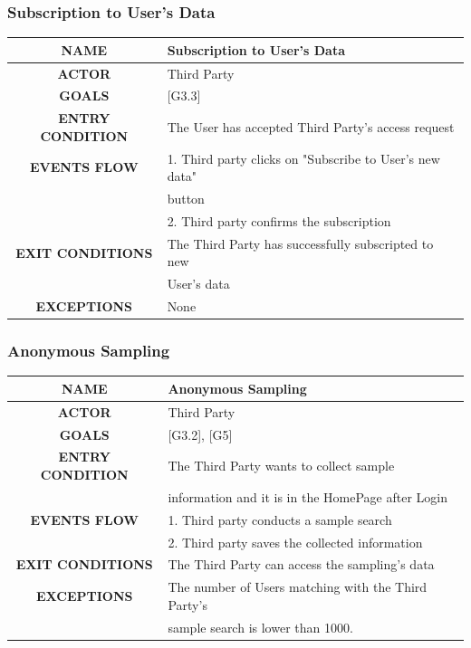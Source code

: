 \documentclass[12pt,a4paper]{article}
\begin{document}
		\subsubsection{Subscription to User's Data}
		\begin{center}
			\begin{tabular}{| c | l |}
				\hline
				\textbf{NAME} & Subscription to User's Data \\
				\hline
				\textbf{ACTOR} & Third Party \\
				\hline
				\textbf{GOALS} & [G3.3] \\
				\hline
				\textbf{ENTRY CONDITION} & The User has accepted Third Party's access request \\ \hline
				\textbf{EVENTS FLOW}  &
				1. Third party clicks on "Subscribe to User's new data" \\ 
				& button\\
				&2. Third party confirms the subscription\\
				\hline
				\textbf{EXIT CONDITIONS}  & The Third Party has successfully subscripted to new\\
				& User's data \\ \hline
				\textbf{EXCEPTIONS} &
				None\\
				\hline
			\end{tabular}
		\end{center}
	
	\newpage
	\subsubsection{Anonymous Sampling}
	\begin{center}
		\begin{tabular}{| c | l |}
			\hline
			\textbf{NAME} & Anonymous Sampling \\
			\hline
			\textbf{ACTOR} & Third Party \\
			\hline
			\textbf{GOALS} & [G3.2], [G5] \\
			\hline
			\textbf{ENTRY CONDITION} & The Third Party wants to collect sample\\ & information and it is in the HomePage after Login \\ 
			\hline
			\textbf{EVENTS FLOW}  &
			1. Third party conducts a sample search\\
			&2. Third party saves the collected information\\
			\hline
			\textbf{EXIT CONDITIONS}  & The Third Party can access the sampling's data\\ \hline
			\textbf{EXCEPTIONS} &
			The number of Users matching with the Third Party's\\
			&sample search is lower than 1000.\\
			\hline
		\end{tabular}
	\end{center}
\end{document}
